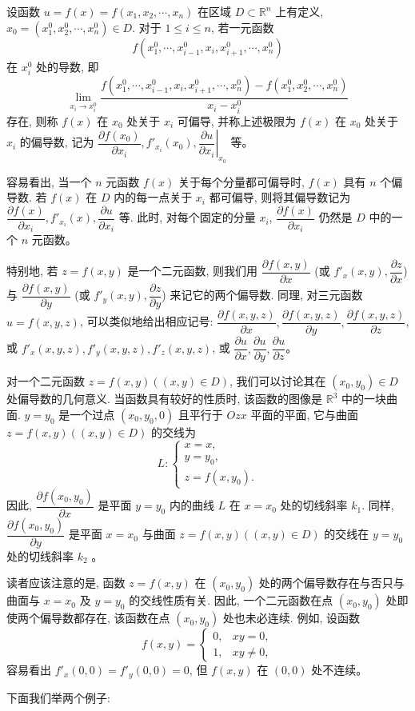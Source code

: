 \documentclass[UTF8,12pt,a4paper,fontset=fandol]{ctexart}
\begin{document}
\begin{definition}\label{course-definition-14-1-1}\quad 设函数 $u=f(x)=f(x_1,x_2,\cdots,x_n)$ 在区域 $D\subset\mathbb R^n$ 上有定义, $x_0=(x_1^0,x_2^0,\cdots,x_n^0)\in D$. 对于 $1\leqslant i\leqslant n$, 若一元函数
\[
  f(x_1^0,\cdots,x_{i-1}^0,x_i,x_{i+1}^0,\cdots,x_n^0)
\]
在 $x_i^0$ 处的导数, 即
\[
  \lim_{x_i\to x_i^0}
  \frac{f(x_1^0,\cdots,x_{i-1}^0,x_i,x_{i+1}^0,\cdots,x_n^0)
  -f(x_1^0,x_2^0,\cdots,x_n^0)}{x_i-x_i^0}
\]
存在, 则称 $f(x)$ 在 $x_0$ 处关于 $x_i$ 可偏导, 并称上述极限为 $f(x)$ 在 $x_0$ 处关于 $x_i$ 的偏导数, 记为 $\dfrac{\partial f(x_0)}{\partial x_i}, f'_{x_i}(x_0), \left.\dfrac{\partial u}{\partial x_i}\right|_{x_0}$ 等。

容易看出, 当一个 $n$ 元函数 $f(x)$ 关于每个分量都可偏导时, $f(x)$ 具有 $n$ 个偏导数. 若 $f(x)$ 在 $D$ 内的每一点关于 $x_i$ 都可偏导, 则将其偏导数记为 $\dfrac{\partial f(x)}{\partial x_i}, f'_{x_i}(x), \dfrac{\partial u}{\partial x_i}$ 等. 此时, 对每个固定的分量 $x_i$, $\dfrac{\partial f(x)}{\partial x_i}$ 仍然是 $D$ 中的一个 $n$ 元函数。

特别地, 若 $z=f(x,y)$ 是一个二元函数, 则我们用 $\dfrac{\partial f(x,y)}{\partial x}$ (或 $f'_x(x,y), \dfrac{\partial z}{\partial x}$) 与 $\dfrac{\partial f(x,y)}{\partial y}$ (或 $f'_y(x,y), \dfrac{\partial z}{\partial y}$) 来记它的两个偏导数. 同理, 对三元函数 $u=f(x,y,z)$, 可以类似地给出相应记号: $\dfrac{\partial f(x,y,z)}{\partial x}, \dfrac{\partial f(x,y,z)}{\partial y}, \dfrac{\partial f(x,y,z)}{\partial z}$, 或 $f'_x(x,y,z), f'_y(x,y,z), f'_z(x,y,z)$, 或 $\dfrac{\partial u}{\partial x}, \dfrac{\partial u}{\partial y}, \dfrac{\partial u}{\partial z}$。

对一个二元函数 $z=f(x,y)((x,y)\in D)$, 我们可以讨论其在 $(x_0,y_0)\in D$ 处偏导数的几何意义. 当函数具有较好的性质时, 该函数的图像是 $\mathbb R^3$ 中的一块曲面. $y=y_0$ 是一个过点 $(x_0,y_0,0)$ 且平行于 $Ozx$ 平面的平面, 它与曲面 $z=f(x,y)((x,y)\in D)$ 的交线为
\[
  L:\begin{cases}
    x=x,\\
    y=y_0,\\
    z=f(x,y_0).
  \end{cases}
\]
因此, $\dfrac{\partial f(x_0,y_0)}{\partial x}$ 是平面 $y=y_0$ 内的曲线 $L$ 在 $x=x_0$ 处的切线斜率 $k_1$. 同样, $\dfrac{\partial f(x_0,y_0)}{\partial y}$ 是平面 $x=x_0$ 与曲面 $z=f(x,y)((x,y)\in D)$ 的交线在 $y=y_0$ 处的切线斜率 $k_2$ 。

读者应该注意的是, 函数 $z=f(x,y)$ 在 $(x_0,y_0)$ 处的两个偏导数存在与否只与曲面与 $x=x_0$ 及 $y=y_0$ 的交线性质有关. 因此, 一个二元函数在点 $(x_0,y_0)$ 处即使两个偏导数都存在, 该函数在点 $(x_0,y_0)$ 处也未必连续. 例如, 设函数
\[
  f(x,y)=
  \begin{cases}
    0, & xy=0,\\
    1, & xy\ne0,
  \end{cases}
\]
容易看出 $f'_x(0,0)=f'_y(0,0)=0$, 但 $f(x,y)$ 在 $(0,0)$ 处不连续。

下面我们举两个例子:

\end{definition}
\end{document}
